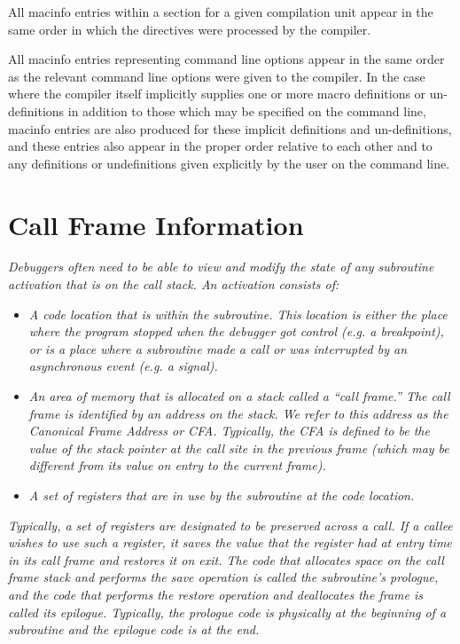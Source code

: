 All macinfo entries within a 
section for a
given compilation unit appear in the same order in which the
directives were processed by the compiler.

All macinfo entries representing command line options appear
in the same order as the relevant command line options
were given to the compiler. In the case where the compiler
itself implicitly supplies one or more macro definitions or
un-definitions in addition to those which may be specified on
the command line, macinfo entries are also produced for these
implicit definitions and un-definitions, and these entries
also appear in the proper order relative to each other and
to any definitions or undefinitions given explicitly by the
user on the command line.



\section{Call Frame Information}
\label{chap:callframeinformation}




\textit{Debuggers often need to be able to view and modify the state of any subroutine activation that is
on the call stack. An activation consists of:}

\begin{itemize}
\item \textit{A code location that is within the
subroutine. This location is either the place where the program
stopped when the debugger got control (e.g. a breakpoint), or
is a place where a subroutine made a call or was interrupted
by an asynchronous event (e.g. a signal).}

\item \textit{An area of memory that is allocated on a stack called a
``call frame.'' The call frame is identified by an address
on the stack. We refer to this address as the Canonical
Frame Address or CFA. Typically, the CFA is defined to be the
value of the stack pointer at the call site in the previous
frame (which may be different from its value on entry to the
current frame).}

\item \textit{A set of registers that are in use by the subroutine
at the code location.}

\end{itemize}

\textit{Typically, a set of registers are designated to be preserved
across a call. If a callee wishes to use such a register, it
saves the value that the register had at entry time in its call
frame and restores it on exit. The code that allocates space
on the call frame stack and performs the save operation is
called the subroutine’s prologue, and the code that performs
the restore operation and deallocates the frame is called its
epilogue. Typically, the prologue code is physically at the
beginning of a subroutine and the epilogue code is at the end.}

